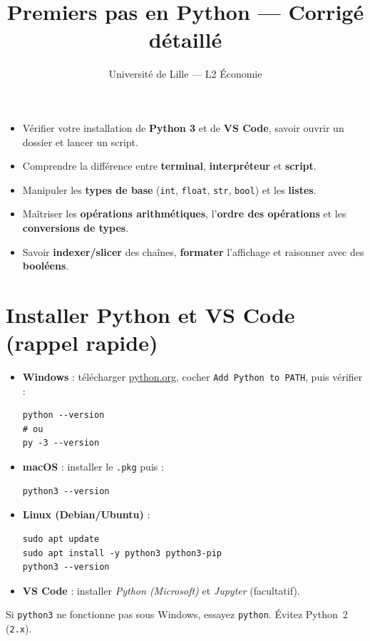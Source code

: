 \documentclass[11pt,a4paper]{article}
\title{\textbf{Premiers pas en Python — Corrigé détaillé}}
\author{Université de Lille — L2 Économie}
\date{}
\begin{document}
\maketitle

\begin{tcolorbox}[title=\large Objectifs du TP (version corrigée pour révision)]
\begin{itemize}
  \item Vérifier votre installation de \textbf{Python 3} et de \textbf{VS Code}, savoir ouvrir un dossier et lancer un script.
  \item Comprendre la différence entre \textbf{terminal}, \textbf{interpréteur} et \textbf{script}.
  \item Manipuler les \textbf{types de base} (\texttt{int}, \texttt{float}, \texttt{str}, \texttt{bool}) et les \textbf{listes}.
  \item Maîtriser les \textbf{opérations arithmétiques}, l’\textbf{ordre des opérations} et les \textbf{conversions de types}.
  \item Savoir \textbf{indexer/slicer} des chaînes, \textbf{formater} l’affichage et raisonner avec des \textbf{booléens}.
\end{itemize}
\end{tcolorbox}

\section*{Installer Python et VS Code (rappel rapide)}
\begin{itemize}
  \item \textbf{Windows} : télécharger \href{https://www.python.org/downloads/}{python.org}, cocher \texttt{Add Python to PATH}, puis vérifier :
\begin{lstlisting}[language=terminal]
python --version
# ou
py -3 --version
\end{lstlisting}
  \item \textbf{macOS} : installer le \texttt{.pkg} puis :
\begin{lstlisting}[language=terminal]
python3 --version
\end{lstlisting}
  \item \textbf{Linux (Debian/Ubuntu)} :
\begin{lstlisting}[language=terminal]
sudo apt update
sudo apt install -y python3 python3-pip
python3 --version
\end{lstlisting}
  \item \textbf{VS Code} : installer \textit{Python (Microsoft)} et \textit{Jupyter} (facultatif).
\end{itemize}
\begin{AlerteBox}
Si \texttt{python3} ne fonctionne pas sous Windows, essayez \texttt{python}. Évitez Python~2 (\texttt{2.x}).
\end{AlerteBox}
\end{document}
